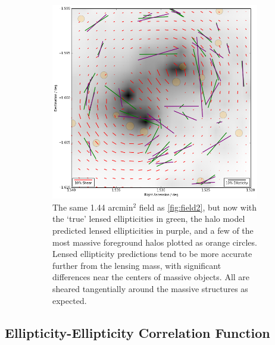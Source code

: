 \documentclass[%
 reprint,
 amsmath,amssymb,
 aps,nofootinbib
]{revtex4-1}
\begin{document}
\begin{figure}
\begin{subfigure}[H]{0.45\textwidth}
        \includegraphics[width=\textwidth]{figs-swe/thesis/field3.png}
        \captionsetup{justification=raggedright,singlelinecheck=false}
        \caption{The same 1.44 arcmin$^2$ field as \ref{fig:field2}, but now with the `true' lensed ellipticities in green, the halo model predicted lensed ellipticities in purple, and a few of the most massive foreground halos plotted as orange circles. Lensed ellipticity predictions tend to be more accurate further from the lensing mass, with significant differences near the centers of massive objects. All are sheared tangentially around the massive structures as expected.}
        \label{fig:field3}
    \end{subfigure}
    \caption{}
    \label{field}
\end{figure}


\subsection{Ellipticity-Ellipticity Correlation Function}
\end{document}
